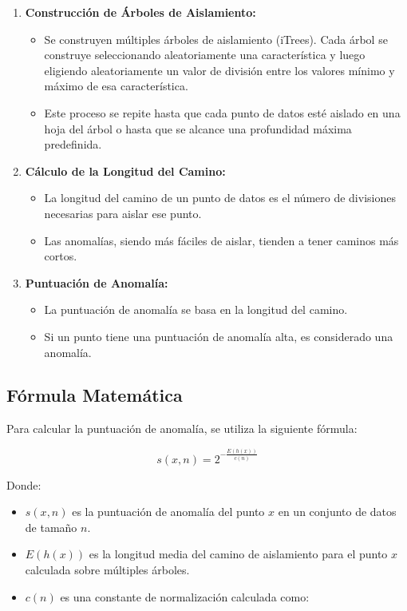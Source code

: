 \begin{enumerate}
    \item \textbf{Construcción de Árboles de Aislamiento:}
    \begin{itemize}
        \item Se construyen múltiples árboles de aislamiento (iTrees). Cada árbol se construye seleccionando aleatoriamente una característica y luego eligiendo aleatoriamente un valor de división entre los valores mínimo y máximo de esa característica.
        \item Este proceso se repite hasta que cada punto de datos esté aislado en una hoja del árbol o hasta que se alcance una profundidad máxima predefinida.
    \end{itemize}

    \item \textbf{Cálculo de la Longitud del Camino:}
    \begin{itemize}
        \item La longitud del camino de un punto de datos es el número de divisiones necesarias para aislar ese punto.
        \item Las anomalías, siendo más fáciles de aislar, tienden a tener caminos más cortos.
    \end{itemize}

    \item \textbf{Puntuación de Anomalía:}
    \begin{itemize}
        \item La puntuación de anomalía se basa en la longitud del camino.
        \item Si un punto tiene una puntuación de anomalía alta, es considerado una anomalía.
    \end{itemize}
\end{enumerate}

\subsection*{Fórmula Matemática}

Para calcular la puntuación de anomalía, se utiliza la siguiente fórmula:

\[
s(x, n) = 2^{-\frac{E(h(x))}{c(n)}}
\]

Donde:
\begin{itemize}
    \item \( s(x, n) \) es la puntuación de anomalía del punto \( x \) en un conjunto de datos de tamaño \( n \).
    \item \( E(h(x)) \) es la longitud media del camino de aislamiento para el punto \( x \) calculada sobre múltiples árboles.
    \item \( c(n) \) es una constante de normalización calculada como:
\end{itemize}

